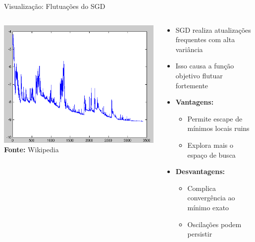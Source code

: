 \documentclass[aspectratio=1610]{beamer}
\begin{document}
\begin{frame}{Visualização: Flutuações do SGD}
\begin{columns}[T]  %
\begin{column}{0.48\textwidth}
\includegraphics[width=\textwidth]{figures/sgd_fluctuation.png}
\scriptsize{\textbf{Fonte:} Wikipedia}
\end{column}

\begin{column}{0.48\textwidth}
\begin{itemize}
    \item SGD realiza atualizações frequentes com alta variância
    \item Isso causa a função objetivo flutuar fortemente
    \item \textbf{Vantagens:}
    \begin{itemize}
        \item Permite escape de mínimos locais ruins
        \item Explora mais o espaço de busca
    \end{itemize}
    \item \textbf{Desvantagens:}
    \begin{itemize}
        \item Complica convergência ao mínimo exato
        \item Oscilações podem persistir
    \end{itemize}
\end{itemize}
\end{column}
\end{columns}
\end{frame}
\end{document}
